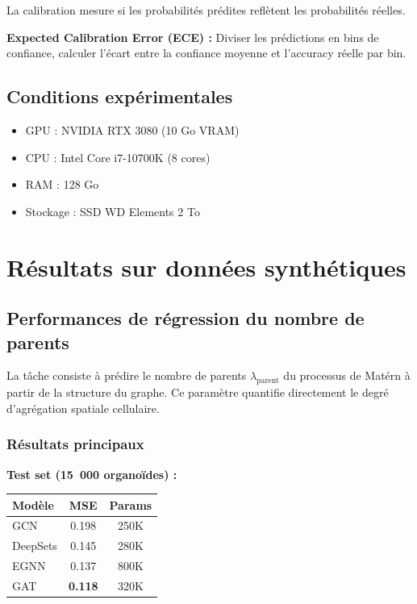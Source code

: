 La calibration mesure si les probabilités prédites reflètent les probabilités réelles.

\textbf{Expected Calibration Error (ECE) :}
Diviser les prédictions en bins de confiance, calculer l'écart entre la confiance moyenne et l'accuracy réelle par bin.

\subsection{Conditions expérimentales}

\begin{itemize}
    \item GPU : NVIDIA RTX 3080 (10 Go VRAM)
    \item CPU : Intel Core i7-10700K (8 cores)
    \item RAM : 128 Go
    \item Stockage : SSD WD Elements 2 To
\end{itemize}

\section{Résultats sur données synthétiques}

\subsection{Performances de régression du nombre de parents}

La tâche consiste à prédire le nombre de parents $\lambda_{\text{parent}}$ du processus de Matérn à partir de la structure du graphe. Ce paramètre quantifie directement le degré d'agrégation spatiale cellulaire.

\subsubsection{Résultats principaux}

\textbf{Test set (15~000 organoïdes) :}

\begin{center}
\begin{tabular}{|l|c|c|}
\hline
\textbf{Modèle} & \textbf{MSE} & \textbf{Params} \\
\hline
GCN & 0.198 & 250K \\
DeepSets & 0.145 & 280K \\
EGNN & 0.137 & 800K \\
GAT & \textbf{0.118} & 320K \\
\hline
\end{tabular}
\end{center}

